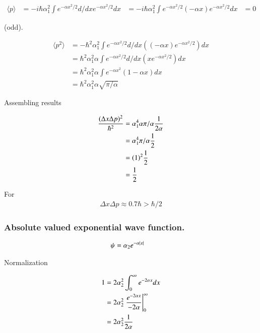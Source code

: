 \documentclass{article}
\newcommand{\expectation}[1]{\langle{#1}\rangle}
\begin{document}
\begin{align*}
\expectation{p} 
&= -i \hbar \alpha_1^2 \int e^{-\alpha x^2 /2} d/dx e^{-\alpha x^2 /2} dx
&= -i \hbar \alpha_1^2 \int e^{-\alpha x^2 /2} (-\alpha x) e^{-\alpha x^2 /2} dx
&= 0
\end{align*}

(odd).

\begin{align*}
\expectation{p^2} 
&= - \hbar^2 \alpha_1^2 \int e^{-\alpha x^2 /2} d/dx ((-\alpha x) e^{-\alpha x^2 /2}) dx \\
&= \hbar^2 \alpha_1^2 \alpha \int e^{-\alpha x^2 /2} d/dx (x e^{-\alpha x^2 /2}) dx \\
&= \hbar^2 \alpha_1^2 \alpha \int e^{-\alpha x^2 } ( 1 - \alpha x) dx \\
&= \hbar^2 \alpha_1^2 \alpha \sqrt{\pi/\alpha}
\end{align*}

Assembling results

\begin{align*}
\frac{(\Delta x \Delta p)^2}{\hbar^2} 
&= \alpha_1^4 \alpha {\pi/\alpha} \frac{1}{2\alpha} \\
&= \alpha_1^4 {\pi/\alpha} \frac{1}{2} \\
&= (1)^2 \frac{1}{2} \\
&= \frac{1}{2} \\
\end{align*}

For
\begin{align*}
\Delta x \Delta p \approx 0.7 \hbar > \hbar/2
\end{align*}

\subsubsection{ Absolute valued exponential wave function. }

\begin{align*}
\psi &= \alpha_2 e^{-\alpha\left\lvert{x}\right\rvert}
\end{align*}

Normalization

\begin{align*}
1 
&= 2 \alpha_2^2 \int_0^\infty e^{-2 \alpha{x}} dx \\
&= 2 \alpha_2^2 \left. \frac{e^{-2 \alpha{x}}}{-2\alpha} \right\vert_0^\infty \\
&= 2 \alpha_2^2 \frac{1}{2\alpha}
\end{align*}
\end{document}
